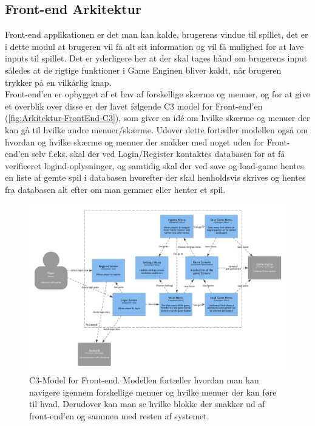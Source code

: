 \subsection{Front-end Arkitektur}

Front-end applikationen er det man kan kalde, brugerens vindue til spillet, det er i dette modul at brugeren vil få alt sit information og vil få mulighed for at lave inputs til spillet. Det er yderligere her at der skal tages hånd om brugerens input således at de rigtige funktioner i Game Enginen bliver kaldt, når brugeren trykker på en vilkårlig knap.\\
Front-end'en er opbygget af et hav af forskellige skærme og menuer, og for at give et overblik over disse er der lavet følgende C3 model for Front-end'en (\autoref{fig:Arkitektur-FrontEnd-C3}), som giver en idé om hvilke skærme og menuer der kan gå til hvilke andre menuer/skærme. Udover dette fortæller modellen også om hvordan og hvilke skærme og menuer der snakker med noget uden for Front-end'en selv f.eks. skal der ved Login/Register kontaktes databasen for at få verificeret logind-oplysninger, og samtidig skal der ved save og load-game hentes en liste af gemte spil i databasen hvorefter der skal henholdsvis skrives og hentes fra databasen alt efter om man gemmer eller henter et spil.

\begin{figure}[H]
\centering
\includegraphics[width = \textwidth]{02-Body/Images/Frontend_C3.pdf}
\caption{C3-Model for Front-end. Modellen fortæller hvordan man kan navigere igennem forskellige menuer og hvilke menuer der kan føre til hvad. Derudover kan man se hvilke blokke der snakker ud af front-end'en og sammen med resten af systemet.}
\label{fig:Arkitektur-FrontEnd-C3}
\end{figure}

